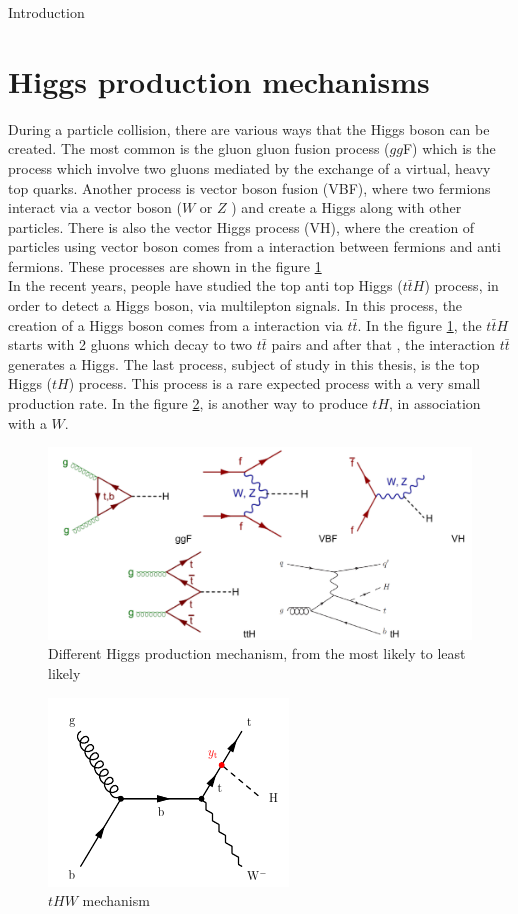 \begin{chapter}{Introduction}
\section{Higgs production mechanisms}
During a particle collision, there are various ways that the Higgs boson can be created. The most common is the gluon gluon fusion process ($gg$F) which is the process which involve two gluons  mediated by the exchange of a virtual, heavy top
quarks.  Another process  is vector boson fusion (VBF), where two fermions interact via a vector boson ($W$ or $Z$ ) and create a Higgs along with other particles. There is also the vector Higgs process (VH), where the creation of particles using vector boson comes from a interaction between fermions and anti fermions\cite{pd}. These processes are shown in the figure \ref{psu} \\

In the recent years, people have studied the top anti top Higgs  ($t\bar{t}H$) process, in order to detect a Higgs boson, via multilepton signals\cite{th1}.
In this process, the creation of a Higgs boson comes from a interaction via $t\bar{t}$. In the figure \ref{psu}, the $t\bar{t}H$ starts with 2 gluons which decay to two $t\bar{t}$ pairs and after that , the interaction $t\bar{t}$  generates a Higgs. The last process, subject of study in this thesis, is the top Higgs ($tH$) process. This process is a rare expected process with a very small production rate\cite{pd}. In the figure \ref{thw}, is another way to produce $tH$, in association with a $W$.

\begin{figure}[htbp]
\centering
\includegraphics[scale=0.5]{Chapter1/pg.png}
\caption{Different Higgs production mechanism, from the most likely to least likely}
\label{psu}
\end{figure}


\begin{figure}[htbp]
\centering
\includegraphics[scale=0.7]{Chapter1/thw.png}
\caption{$tHW$ mechanism}
\label{thw}
\end{figure}


\end{chapter}
